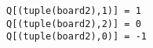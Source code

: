 \documentclass[12pt]{report}
\begin{document}
\begin{small}
\begin{lstlisting}
Q[(tuple(board2),1)] = 1
Q[(tuple(board2),2)] = 0
Q[(tuple(board2),0)] = -1
\end{lstlisting}
\end{small}

\begin{comment} 
After sufficient trials of different combinations of these parameters and assigning suitable reinforcement values now we have our $Q$ function trained. Now just to test it we will give a random choice of parameters and see the reinforcement values for this combination and decide what should be the best action. 

Following are the Figures~\ref{fig:RL_Local}, \ref{fig:RL_offload_Local}, and \ref{fig:RL_offload_Remote} where three different instances with suitable different actions each time.    
            
\begin{figure}[h!]
  \centering
  \texttt{[image: "GIMP Images/RL\_Local".png]}
  \caption{Best Action: Local Processing}
  \label{fig:RL_Local}
\end{figure}
\begin{figure}[h!]
  \centering
  \texttt{[image: "GIMP Images/RL\_offload\_Local".png]}
  \caption{Best Action: Offload on Local servers, Second best action: Offload on remote Server}
  \label{fig:RL_offload_Local}
\end{figure}
\begin{figure}[h!]
  \centering
  \texttt{[image: "GIMP Images/RL\_offload\_Remote".png]}
  \caption{Best Action: Offload on Remote servers, Second best action: Offload on Local Server}
  \label{fig:RL_offload_Remote}
\end{figure}
\end{comment}
\begin{comment}
\subsubsection{Scenario 2}
In the previous scenario we do not have multiple steps of reinforcements. RL also works in the situation where we have different stages and steps for example in a tic-tac-toe game or even chess. So the previous scenario does not exploit the multiple step option available with RL.\par
In this second scenario we can envision a situation where we need to further choose from right actions after we have decided whether to offload or not, for example after offloading we might lower the CPU frequency rate of the device to lower the battery consumption, or after offloading we can choose for a specific service that is being offered by the Commercial server provider to get the best of what is available with us and so on.\par
We can also add time factor as a parameter as sometimes it is seen that the internet speed or performance varies depending which part of day we are using it (because of varying load of users).
\end{comment}
\end{document}
